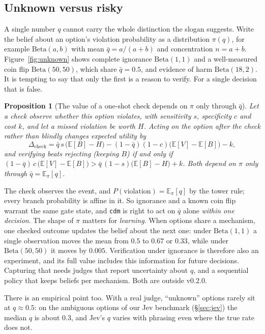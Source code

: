 \documentclass[11pt]{article}
\newtheorem{proposition}{Proposition}
\theoremstyle{definition}
\begin{document}
\subsection{Unknown versus risky}\label{sec:unknown}

A single number $q$ cannot carry the whole distinction the slogan suggests. Write the belief about
an option's violation probability as a distribution $\pi(q)$, for example $\mathrm{Beta}(a,b)$ with
mean $\bar q=a/(a+b)$ and concentration $n=a+b$. Figure~\ref{fig:unknown} shows complete ignorance
$\mathrm{Beta}(1,1)$ and a well-measured coin flip $\mathrm{Beta}(50,50)$, which share $\bar q=0.5$,
and evidence of harm $\mathrm{Beta}(18,2)$. It is tempting to say that only the first is a reason to
verify. For a single decision that is false.

\begin{proposition}[The value of a one-shot check depends on $\pi$ only through $\bar q$]
\label{prop:voc}
Let a check observe whether \emph{this} option violates, with sensitivity $s$, specificity $c$ and
cost $k$, and let a missed violation be worth $H$. Acting on the option after the check rather than
blindly changes expected utility by
\[
\Delta_{\text{check}}=\bar q\,s\,\bigl(\mathbb E[B]-H\bigr)-(1-\bar q)(1-c)\bigl(\mathbb E[V]-\mathbb E[B]\bigr)-k,
\]
and verifying beats rejecting (keeping $B$) if and only if
$(1-\bar q)\,c\,\bigl(\mathbb E[V]-\mathbb E[B]\bigr)>\bar q\,(1-s)\bigl(\mathbb E[B]-H\bigr)+k$.
Both depend on $\pi$ only through $\bar q=\mathbb E_\pi[q]$.
\end{proposition}

The check observes the event, and $P(\text{violation})=\mathbb E_\pi[q]$ by the tower rule; every
branch probability is affine in it. So ignorance and a known coin flip warrant the same gate state,
and \texttt{cdm} is right to act on $\bar q$ alone \emph{within one decision}. The shape of $\pi$
matters for \emph{learning}. When options share a mechanism, one checked outcome updates the belief
about the next one: under $\mathrm{Beta}(1,1)$ a single observation moves the mean from $0.5$ to
$0.67$ or $0.33$, while under $\mathrm{Beta}(50,50)$ it moves by $0.005$. Verification under
ignorance is therefore also an experiment, and its full value includes this information for future
decisions. Capturing that needs judges that report uncertainty about $q$, and a sequential policy
that keeps beliefs per mechanism. Both are outside v0.2.0.

There is an empirical point too. With a real judge, ``unknown'' options rarely sit at $q\approx0.5$:
on the ambiguous options of our Jev benchmark (\S\ref{sec:jev}) the median $q$ is about $0.3$, and
Jev's $q$ varies with phrasing even where the true rate does not.
\end{document}
